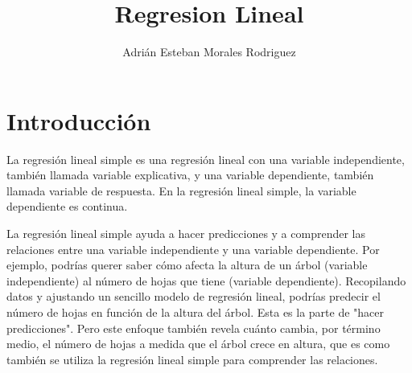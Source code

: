 \documentclass{article}
\title{Regresion Lineal}
\author{Adrián Esteban Morales Rodriguez}
\begin{document}
\maketitle

\section{Introducción}
La regresión lineal simple es una regresión lineal con una variable independiente, también llamada variable explicativa, y una variable dependiente, también llamada variable de respuesta. En la regresión lineal simple, la variable dependiente es continua. 

La regresión lineal simple ayuda a hacer predicciones y a comprender las relaciones entre una variable independiente y una variable dependiente. Por ejemplo, podrías querer saber cómo afecta la altura de un árbol (variable independiente) al número de hojas que tiene (variable dependiente). Recopilando datos y ajustando un sencillo modelo de regresión lineal, podrías predecir el número de hojas en función de la altura del árbol. Esta es la parte de "hacer predicciones". Pero este enfoque también revela cuánto cambia, por término medio, el número de hojas a medida que el árbol crece en altura, que es como también se utiliza la regresión lineal simple para comprender las relaciones.
\end{document}
